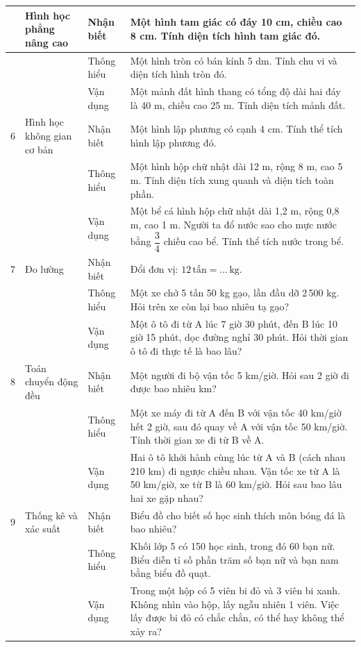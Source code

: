 \begin{longtable}{|>{\centering\arraybackslash}m{0.8cm}|m{3.5cm}|>{\centering\arraybackslash}m{2cm}|m{7.5cm}|}
	5 & Hình học phẳng nâng cao
	& Nhận biết & Một hình tam giác có đáy 10 cm, chiều cao 8 cm. Tính diện tích hình tam giác đó. \\
	\cline{3-4}
	& & Thông hiểu & Một hình tròn có bán kính 5 dm. Tính chu vi và diện tích hình tròn đó. \\
	\cline{3-4}
	& & Vận dụng & Một mảnh đất hình thang có tổng độ dài hai đáy là 40 m, chiều cao 25 m. Tính diện tích mảnh đất. \\
	\hline

	6 & Hình học không gian cơ bản
	& Nhận biết & Một hình lập phương có cạnh 4 cm. Tính thể tích hình lập phương đó. \\
	\cline{3-4}
	& & Thông hiểu & Một hình hộp chữ nhật dài 12 m, rộng 8 m, cao 5 m. Tính diện tích xung quanh và diện tích toàn phần. \\
	\cline{3-4}
	& & Vận dụng & Một bể cá hình hộp chữ nhật dài 1,2 m, rộng 0,8 m, cao 1 m. Người ta đổ nước sao cho mực nước bằng $\dfrac{3}{4}$ chiều cao bể. Tính thể tích nước trong bể. \\
	\hline

	7 & Đo lường
	& Nhận biết & Đổi đơn vị: $12\,\text{tấn} = \ldots\,\text{kg}$. \\
	\cline{3-4}
	& & Thông hiểu & Một xe chở 5 tấn 50 kg gạo, lần đầu dỡ 2\,500 kg. Hỏi trên xe còn lại bao nhiêu tạ gạo? \\
	\cline{3-4}
	& & Vận dụng & Một ô tô đi từ A lúc 7 giờ 30 phút, đến B lúc 10 giờ 15 phút, dọc đường nghỉ 30 phút. Hỏi thời gian ô tô đi thực tế là bao lâu? \\
	\hline

	8 & Toán chuyển động đều
	& Nhận biết & Một người đi bộ vận tốc 5 km/giờ. Hỏi sau 2 giờ đi được bao nhiêu km? \\
	\cline{3-4}
	& & Thông hiểu & Một xe máy đi từ A đến B với vận tốc 40 km/giờ hết 2 giờ, sau đó quay về A với vận tốc 50 km/giờ. Tính thời gian xe đi từ B về A. \\
	\cline{3-4}
	& & Vận dụng & Hai ô tô khởi hành cùng lúc từ A và B (cách nhau 210 km) đi ngược chiều nhau. Vận tốc xe từ A là 50 km/giờ, xe từ B là 60 km/giờ. Hỏi sau bao lâu hai xe gặp nhau? \\
	\hline

	9 & Thống kê và xác suất
	& Nhận biết & Biểu đồ cho biết số học sinh thích môn bóng đá là bao nhiêu? \\
	\cline{3-4}
	& & Thông hiểu & Khối lớp 5 có 150 học sinh, trong đó 60 bạn nữ. Biểu diễn tỉ số phần trăm số bạn nữ và bạn nam bằng biểu đồ quạt. \\
	\cline{3-4}
	& & Vận dụng & Trong một hộp có 5 viên bi đỏ và 3 viên bi xanh. Không nhìn vào hộp, lấy ngẫu nhiên 1 viên. Việc lấy được bi đỏ có chắc chắn, có thể hay không thể xảy ra? \\
	\hline


\end{longtable}
